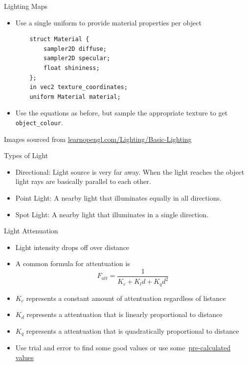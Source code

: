 \documentclass{beamer}
\newcommand{\hrefhand}[2]{\raisebox{-0.4ex}{\HandRight}\,\href{#1}{#2}}
\begin{document}
\begin{frame}[fragile]{Lighting Maps}
\begin{itemize}
\begin{center}
              \end{center}
        \item Use a single uniform to provide material properties per object
              \footnotesize{
                  \begin{verbatim}
    struct Material {
        sampler2D diffuse;
        sampler2D specular;
        float shininess;
    };
    in vec2 texture_coordinates;
    uniform Material material;
\end{verbatim}
              }
        \item Use the equations as before, but sample the appropriate texture to get {\color{blue}\verb"object_colour"}.
    \end{itemize}
    \vfill{}
    {\footnotesize{Images sourced from \url{learnopengl.com/Lighting/Basic-Lighting}}}
\end{frame}

\begin{frame}[fragile]{Types of Light}
    \begin{itemize}
        \item Directional: Light source is very far away. When the light reaches the object
              light rays are basically parallel to each other.
        \item Point Light: A nearby light that illuminates equally in all directions.
        \item Spot Light: A nearby light that illuminates in a single direction.
    \end{itemize}
\end{frame}

\begin{frame}[fragile]{Light Attenuation}
    \begin{itemize}
        \item Light intensity drops off over distance
        \item A common formula for attentuation is
              $$F_{att} = \frac{1}{K_{c} + K_{l}d + K_{q}d^{2}}$$
        \item $K_{c}$ represents a constant amount of attentuation regardless of listance
        \item $K_{d}$ represents a attentuation that is linearly proportional to distance
        \item $K_{q}$ represents a attentuation that is quadratically proportional to distance
        \item Use trial and error to find some good values or use some \hrefhand{https://wiki.ogre3d.org/tiki-index.php?page=-Point+Light+Attenuation}{\color{blue}pre-calculated values}
    \end{itemize}
\end{frame}
\end{document}

